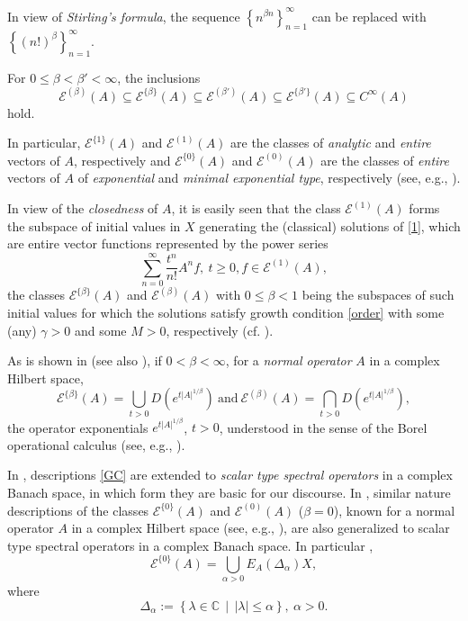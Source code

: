 \documentclass{amsart}
\theoremstyle{plain}
\theoremstyle{definition}
\begin{document}
In view of {\it Stirling's formula}, the 
sequence $\left\{ n^{\beta n}\right\}_{n=1}^\infty$ can be replaced with
$\left\{ (n!)^\beta\right\}_{n=1}^\infty$.

For $0\le\beta<\beta'<\infty$, the inclusions
\begin{equation*}
{\mathscr E}^{(\beta)}(A)\subseteq{\mathscr E}^{\{\beta\}}(A)
\subseteq {\mathscr E}^{(\beta')}(A)\subseteq
{\mathscr E}^{\{\beta'\}}(A)\subseteq C^{\infty}(A)
\end{equation*}
hold.

In particular, ${\mathscr E}^{\{1\}}(A)$ and ${\mathscr E}^{(1)}(A)$ are the classes of {\it analytic} and {\it entire} vectors of $A$, respectively \cite{Goodman,Nelson} and ${\mathscr E}^{\{0\}}(A)$ and ${\mathscr E}^{(0)}(A)$ are the classes of \textit{entire} vectors of $A$ of \textit{exponential} and \textit{minimal exponential type}, respectively (see, e.g., \cite{Radyno1983(1),Gor-Knyaz}).

In view of the \textit{closedness} of $A$, it is easily seen that the class ${\mathscr E}^{(1)}(A)$ forms the subspace of initial values in $X$ generating the (classical) solutions of \eqref{1}, which are entire vector functions represented by the power series
\[
\sum_{n=0}^\infty \dfrac{t^n}{n!}A^nf,\ t\ge 0,
f\in {\mathscr E}^{(1)}(A),
\]
the classes ${\mathscr E}^{\{\beta\}}(A)$ and ${\mathscr E}^{(\beta)}(A)$ with $0\le\beta<1$ being the subspaces of such initial values for which the solutions satisfy growth condition \eqref{order} with some (any) $\gamma>0$ and some $M>0$, respectively (cf. \cite{Levin}).

As is shown in \cite{GorV83} (see also \cite{Gor-Knyaz,book}), if $0<\beta<\infty$, for a {\it normal operator} $A$ in a complex Hilbert space,
\begin{equation}\label{GC}
{\mathscr E}^{\{\beta\}}(A)=\bigcup_{t>0} D(e^{t|A|^{1/\beta}})\ \text{and}\ 
{\mathscr E}^{(\beta)}(A)=\bigcap_{t>0} D(e^{t|A|^{1/\beta}}),
\end{equation}
the operator exponentials $e^{t|A|^{1/\beta}}$, $t>0$, understood in the sense of the Borel operational calculus (see, e.g., \cite{Dun-SchII,Plesner}).

In \cite{Markin2004(2),Markin2015}, descriptions \eqref{GC} are extended  to \textit{scalar type spectral operators} in a complex Banach space, in which form they are basic for our discourse. In \cite{Markin2015}, similar nature descriptions of the classes ${\mathscr E}^{\{0\}}(A)$ and ${\mathscr E}^{(0)}(A)$ ($\beta=0$), known for a normal operator $A$ in a complex Hilbert space (see, e.g., \cite{Gor-Knyaz}), are also generalized to scalar type spectral operators in a complex Banach space. In particular {\cite[Theorem $5.1$]{Markin2015}},
\[
{\mathscr E}^{\{0\}}(A)=\bigcup_{\alpha>0}E_A(\Delta_\alpha)X,
\] 
where
\begin{equation*}
\Delta_\alpha:=\left\{\lambda\in{{\mathbb C}}\,\middle|\,|\lambda|\le \alpha \right\},\ \alpha>0.
\end{equation*}
\end{document}
